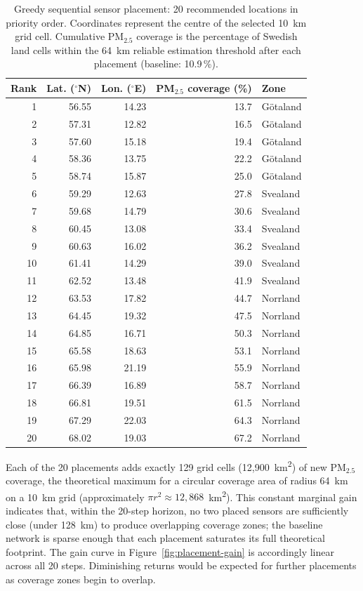 \documentclass[11pt,a4paper]{article}
\begin{document}
\begin{table}[ht]
\caption{Greedy sequential sensor placement: 20 recommended locations in priority order. Coordinates represent the centre of the selected 10~km grid cell. Cumulative PM$_{2.5}$ coverage is the percentage of Swedish land cells within the 64~km reliable estimation threshold after each placement (baseline: 10.9\,\%).}
\label{tab:placement-coords}
\centering
\small
\begin{tabular}{rrrrl}
\hline
\textbf{Rank} & \textbf{Lat. ($^\circ$N)} & \textbf{Lon. ($^\circ$E)} & \textbf{PM$_{2.5}$ coverage (\%)} & \textbf{Zone} \\
\hline
1  & 56.55 & 14.23 & 13.7 & Götaland \\
2  & 57.31 & 12.82 & 16.5 & Götaland \\
3  & 57.60 & 15.18 & 19.4 & Götaland \\
4  & 58.36 & 13.75 & 22.2 & Götaland \\
5  & 58.74 & 15.87 & 25.0 & Götaland \\
6  & 59.29 & 12.63 & 27.8 & Svealand \\
7  & 59.68 & 14.79 & 30.6 & Svealand \\
8  & 60.45 & 13.08 & 33.4 & Svealand \\
9  & 60.63 & 16.02 & 36.2 & Svealand \\
10 & 61.41 & 14.29 & 39.0 & Svealand \\
11 & 62.52 & 13.48 & 41.9 & Svealand \\
12 & 63.53 & 17.82 & 44.7 & Norrland \\
13 & 64.45 & 19.32 & 47.5 & Norrland \\
14 & 64.85 & 16.71 & 50.3 & Norrland \\
15 & 65.58 & 18.63 & 53.1 & Norrland \\
16 & 65.98 & 21.19 & 55.9 & Norrland \\
17 & 66.39 & 16.89 & 58.7 & Norrland \\
18 & 66.81 & 19.51 & 61.5 & Norrland \\
19 & 67.29 & 22.03 & 64.3 & Norrland \\
20 & 68.02 & 19.03 & 67.2 & Norrland \\
\hline
\end{tabular}
\end{table}

Each of the 20 placements adds exactly 129 grid cells (12{,}900~km\textsuperscript{2}) of new PM$_{2.5}$ coverage, the theoretical maximum for a circular coverage area of radius 64~km on a 10~km grid (approximately $\pi r^2 \approx 12{,}868$~km\textsuperscript{2}). This constant marginal gain indicates that, within the 20-step horizon, no two placed sensors are sufficiently close (under 128~km) to produce overlapping coverage zones; the baseline network is sparse enough that each placement saturates its full theoretical footprint. The gain curve in Figure~\ref{fig:placement-gain} is accordingly linear across all 20 steps. Diminishing returns would be expected for further placements as coverage zones begin to overlap.
\end{document}
